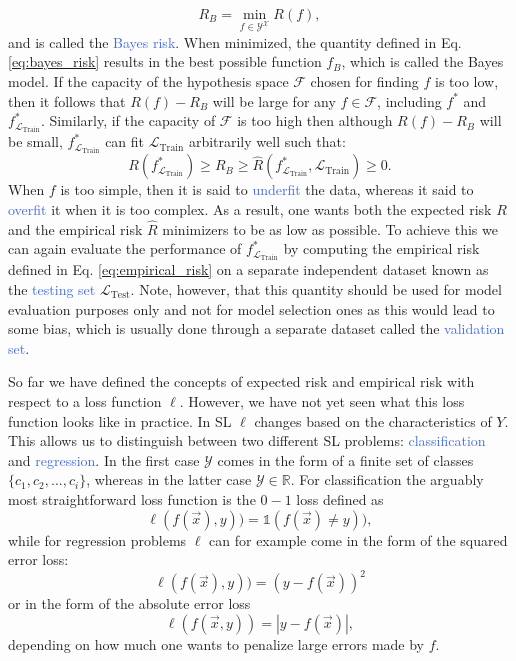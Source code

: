 \begin{equation}
	R_B = \underset{f\in\mathcal{Y}^{\mathcal{X}}}{\min} R(f),
	\label{eq:bayes_risk}
\end{equation}
and is called the \textcolor{RoyalBlue}{Bayes risk}. When minimized, the quantity defined in Eq. \ref{eq:bayes_risk} results in the best possible function $f_B$, which is called the Bayes model. If the capacity of the hypothesis space $\mathcal{F}$ chosen for finding $f$ is too low, then it follows that $R(f)-R_B$ will be large for any $f\in\mathcal{F}$, including $f^{*}$ and $f^{*}_{\mathcal{L}_{\text{Train}}}$. Similarly, if the capacity of $\mathcal{F}$ is too high then although $R(f)-R_B$ will be small, $f^{*}_{\mathcal{L}_\text{Train}}$ can fit 
$\mathcal{L}_{\text{Train}}$ arbitrarily well such that:
\begin{equation}
	R(f^{*}_{\mathcal{L}_{\text{Train}}}) \geq R_B \geq \hat{R}(f^{*}_{\mathcal{L}_{\text{Train}}},\mathcal{L}_{\text{Train}}) \geq 0.
\end{equation}
When $f$ is too simple, then it is said to \textcolor{RoyalBlue}{underfit} the data, whereas it said to \textcolor{RoyalBlue}{overfit} it when it is too complex. As a result, one wants both the expected risk $R$ and the empirical risk $\hat{R}$ minimizers to be as low as possible. To achieve this we can again evaluate the performance of $f^{*}_{\mathcal{L}_{\text{Train}}}$ by computing the empirical risk defined in Eq. \ref{eq:empirical_risk} on a separate independent dataset known as the \textcolor{RoyalBlue}{testing set} $\mathcal{L}_{\text{Test}}$. Note, however, that this quantity should be used for model evaluation purposes only and not for model selection ones as this would lead to some bias, which is usually done through a separate dataset called the \textcolor{RoyalBlue}{validation set}. 

So far we have defined the concepts of expected risk and empirical risk with respect to a loss function $\ell$. However, we have not yet seen what this loss function looks like in practice. In SL $\ell$ changes based on the characteristics of $Y$. This allows us to distinguish between two different SL problems: \textcolor{RoyalBlue}{classification} and \textcolor{RoyalBlue}{regression}. In the first case $\mathcal{Y}$ comes in the form of a finite set of classes $\{c_1, c_2,...,c_i\}$, whereas in the latter case $\mathcal{Y}\in\mathds{R}$. For classification the arguably most straightforward loss function is the $0-1$ loss defined as 
\begin{equation}
	\ell(f(\vec{x}),y)) = \mathbb{1}(f(\vec{x})\neq y)),
\end{equation}
while for regression problems $\ell$ can for example come in the form of the squared error loss:
\begin{equation}
	\ell(f(\vec{x}),y))=(y-f(\vec{x}))^2
\end{equation}
or in the form of the absolute error loss
\begin{equation}
	\ell(f(\vec{x},y))=|y-f(\vec{x})|,
\end{equation}
depending on how much one wants to penalize large errors made by $f$.

